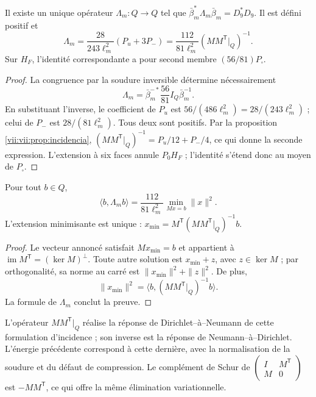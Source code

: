 \begin{theorem}
\label{vii:vii:thm:respuesta-unica}
Il existe un unique opérateur \(\Lambda_m:Q\longrightarrow Q\) tel que
\(\bar\beta_m^*\Lambda_m\bar\beta_m=D_9^*D_9\). Il est défini positif et
\begin{equation}
 \Lambda_m=\frac{28}{243\ell_m^2}(P_u+3P_-)
 =\frac{112}{81\ell_m^2}
       (MM^{\mathsf T}|_Q)^{-1}.
 \label{vii:vii:eq:lambda-pantalla}
\end{equation}
Sur \(H_F\), l'identité correspondante a pour second membre
\((56/81)P_\square\).
\end{theorem}

\begin{proof}
La congruence par la soudure inversible détermine nécessairement
\[
 \Lambda_m=\bar\beta_m^{-*}\frac{56}{81}I_Q\bar\beta_m^{-1}.
\]
En substituant l'inverse, le coefficient de \(P_u\) est \(56/(486\ell_m^2)=28/(243\ell_m^2)\) ; celui de \(P_-\) est \(28/(81\ell_m^2)\). Tous deux sont positifs. Par la proposition \ref{vii:vii:prop:incidencia}, \((MM^{\mathsf T}|_Q)^{-1}=P_u/12+P_-/4\), ce qui donne la seconde expression. L'extension à six faces annule \(P_0H_F\) ; l'identité s'étend donc au moyen de \(P_\square\).
\end{proof}

\begin{proposition}
\label{vii:vii:prop:minima-extension}
Pour tout \(b\in Q\),
\[
 \langle b,\Lambda_m b\rangle
 =\frac{112}{81\ell_m^2}
   \min_{Mx=b}\|x\|^2.
\]
L'extension minimisante est unique :
\(x_{\min}=M^{\mathsf T}(MM^{\mathsf T}|_Q)^{-1}b\).
\end{proposition}

\begin{proof}
Le vecteur annoncé satisfait \(Mx_{\min}=b\) et appartient à
\(\operatorname{im}M^{\mathsf T}=(\ker M)^\perp\).
Toute autre solution est \(x_{\min}+z\), avec \(z\in\ker M\) ; par
orthogonalité, sa norme au carré est \(\|x_{\min}\|^2+\|z\|^2\).
De plus,
\[
 \|x_{\min}\|^2
 =\langle b,(MM^{\mathsf T}|_Q)^{-1}b\rangle.
\]
La formule de \(\Lambda_m\) conclut la preuve.
\end{proof}

L'opérateur \(MM^{\mathsf T}|_Q\) réalise la réponse
de Dirichlet--à--Neumann de cette formulation d'incidence ; son inverse
est la réponse de Neumann--à--Dirichlet. L'énergie précédente correspond
à cette dernière, avec la normalisation de la soudure et du défaut de
compression. Le complément de Schur de
\(\left(\begin{smallmatrix}I&M^{\mathsf T}\\M&0\end{smallmatrix}\right)\)
est \(-MM^{\mathsf T}\), ce qui offre la même élimination variationnelle.

